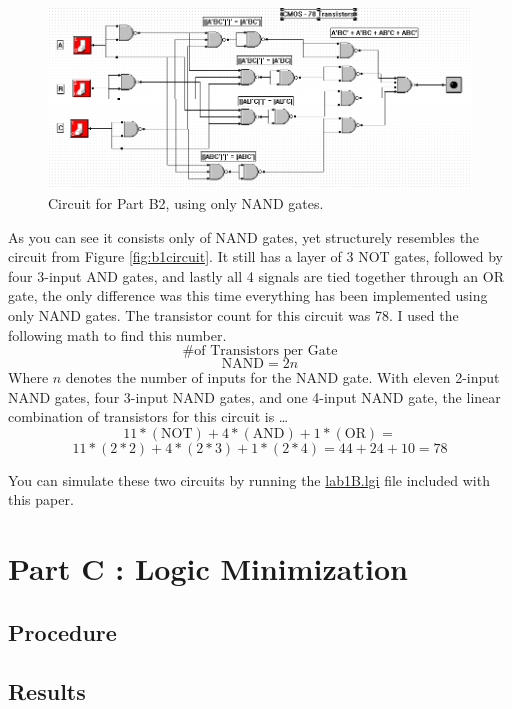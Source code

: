 \documentclass[a4paper,11pt]{article}
\begin{document}
\begin{figure}[h!]
   \centering
     \includegraphics[width=6.5in]{PartB2}
   \caption{Circuit for Part B2, using only NAND gates.}
   \label{fig:b2circuit}
\end{figure}   
As you can see it consists only of NAND gates, yet structurely resembles the circuit from Figure \ref{fig:b1circuit}. It still has a layer of 3 NOT gates, followed by four 3-input AND gates, and lastly all 4 signals are tied together through an OR gate, the only difference was this time everything has been implemented using only NAND gates. The transistor count for this circuit was 78. I used the following math to find this number. 
\[ \text{\# of Transistors per Gate}\]
\[ \text{NAND} = 2n \]
Where $n$ denotes the number of inputs for the NAND gate. With eleven 2-input NAND gates, four 3-input NAND gates, and one 4-input NAND gate, the linear combination of transistors for this circuit is \ldots
\[ 11*(\text{NOT})+4*(\text{AND})+1*(\text{OR}) = \]
\[ 11*(2*2)+4*(2*3)+1*(2*4) = 44+24+10 = 78\]
\par

You can simulate these two circuits by running the \url{lab1B.lgi} file included with this paper.



\section{Part C : Logic Minimization}
\subsection{Procedure}
\subsection{Results}
\end{document}
